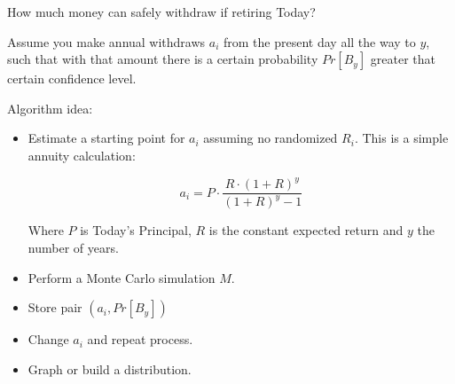 \documentclass[8pt]{article}
\begin{document}
How much money can safely withdraw if retiring Today?

Assume you make annual withdraws $a_i$ from the present day all the way to $y$, such that with that amount there is a certain probability $Pr[B_y]$ greater that certain confidence level.

Algorithm idea:
\begin{itemize}
\item Estimate a starting point for $a_i$ assuming no randomized $R_i$.  This is a simple annuity calculation:

\[ a_i=P \cdot \frac{R \cdot (1+R)^y}{(1+R)^y-1}\]

Where $P$ is Today's Principal, $R$ is the constant expected return and $y$ the number of years.

\item Perform a Monte Carlo simulation $M$.
\item Store pair $(a_i, Pr[B_y])$
\item Change $a_i$ and repeat process.
\item Graph or build a distribution.
\end{itemize}
\end{document}
